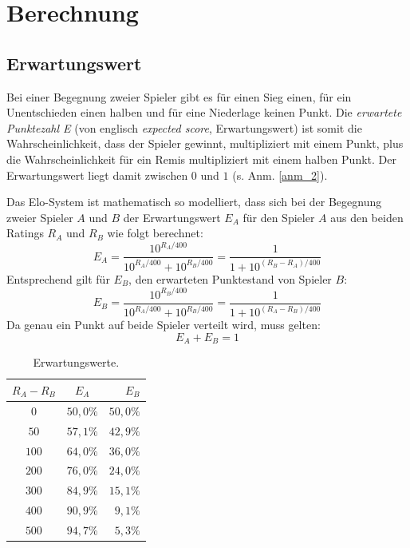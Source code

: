 \chapter{Berechnung}

\section{Erwartungswert}

Bei einer Begegnung zweier Spieler gibt es für einen Sieg einen, für ein Unentschieden einen halben und für eine Niederlage keinen Punkt. Die \textit{erwartete Punktezahl E} (von englisch \textit{expected score}, Erwartungswert) ist somit die Wahrscheinlichkeit, dass der Spieler gewinnt, multipliziert mit einem Punkt, plus die Wahrscheinlichkeit für ein Remis multipliziert mit einem halben Punkt. Der Erwartungswert liegt damit zwischen $0$ und $1$ (s. Anm. \ref{anm_2}).

Das Elo-System ist mathematisch so modelliert, dass sich bei der Begegnung zweier Spieler $A$ und $B$ der Erwartungswert $E_{A}$ für den Spieler $A$ aus den beiden Ratings $R_{A}$ und $R_{B}$ wie folgt berechnet:
\[
    E_{A} = \frac{10^{R_{A}/400}}{10^{R_{A}/400} + 10^{R_{B}/400}} = \frac{1}{1 + 10^{(R_{B} - R_{A})/400}}
\]
Entsprechend gilt für $E_{B}$, den erwarteten Punktestand von Spieler $B$:
\[
    E_{B} = \frac{10^{R_{B}/400}}{10^{R_{A}/400} + 10^{R_{B}/400}} = \frac{1}{1 + 10^{(R_{A} - R_{B})/400}}
\]
Da genau ein Punkt auf beide Spieler verteilt wird, muss gelten:
\[
    E_{A} + E_{B} = 1
\]

\begin{table}
    \centering
    \begin{tabular}{c c r}
        \toprule
        $R_{A} - R_{B}$ & $E_{A}$ & $E_{B}$ \\
        \midrule
        $0$   & $50,0 \%$ & $50,0 \%$ \\
        $50$  & $57,1 \%$ & $42,9 \%$ \\
        $100$ & $64,0 \%$ & $36,0 \%$ \\
        $200$ & $76,0 \%$ & $24,0 \%$ \\
        $300$ & $84,9 \%$ & $15,1 \%$ \\
        $400$ & $90,9 \%$ & $9,1 \%$  \\
        $500$ & $94,7 \%$ & $5,3 \%$  \\
        \bottomrule
    \end{tabular}
    \caption{Erwartungswerte.}
    \label{tab:erwartungswerte}
\end{table}


